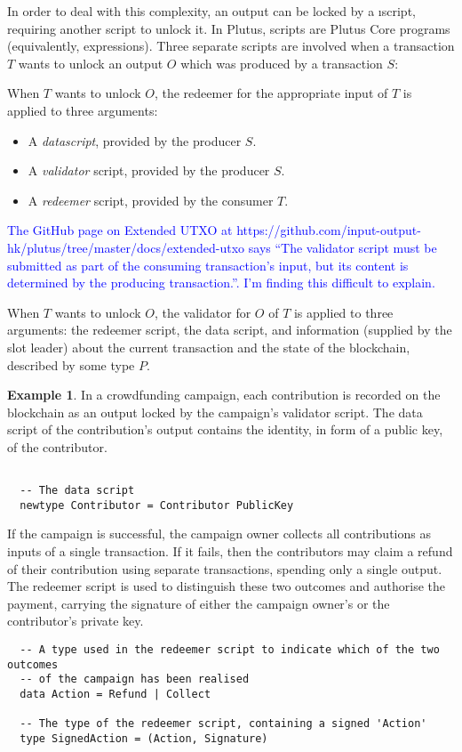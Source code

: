 \documentclass[a4paper]{article}
\newcommand{\blue}[1]{\textcolor{blue}{#1}}
\theoremstyle{definition}  %
\newtheorem{example}{Example}
\begin{document}
In order to deal with this complexity, an output can be locked by a
\i{script}, requiring another script to unlock it.  In Plutus, scripts
are Plutus Core programs (equivalently, expressions). Three separate
scripts are involved when a transaction $T$ wants to unlock an
output $O$ which was produced by a transaction $S$:

When $T$ wants to unlock $O$,
the redeemer for the appropriate input of $T$ is applied to three arguments:
\begin{itemize}
\item A \textit{datascript}, provided by the producer $S$.
\item A \textit{validator} script, provided by the producer $S$. 
\item A \textit{redeemer} script, provided by the consumer $T$.  
\end{itemize}

\blue{The GitHub page on Extended UTXO at
  https://github.com/input-output-hk/plutus/tree/master/docs/extended-utxo
  says ``The validator script must be submitted as part of the
  consuming transaction's input, but its content is determined by the
  producing transaction.''. I'm finding this difficult to explain.}


 When $T$ wants to unlock $O$, the validator for $O$ of $T$ is applied
 to three arguments: the redeemer script, the data script, and
 information (supplied by the slot leader) about the current
 transaction and the state of the blockchain, described by some type
 $P$.

\begin{example} In a crowdfunding campaign, each contribution is recorded on the blockchain as an output locked by the campaign's validator script. The data script of the contribution's output contains the identity, in form of a public key, of the contributor. 

\begin{verbatim}

  -- The data script
  newtype Contributor = Contributor PublicKey

\end{verbatim}

If the campaign is successful, the campaign owner collects all contributions as inputs of a single transaction. If it fails, then the contributors may claim a refund of their contribution using separate transactions, spending only a single output. The redeemer script is used to distinguish these two outcomes and authorise the payment, carrying the signature of either the campaign owner's or the contributor's private key.

\begin{verbatim}
  -- A type used in the redeemer script to indicate which of the two outcomes 
  -- of the campaign has been realised
  data Action = Refund | Collect 

  -- The type of the redeemer script, containing a signed 'Action'
  type SignedAction = (Action, Signature)
\end{verbatim}

\end{example}
\end{document}
